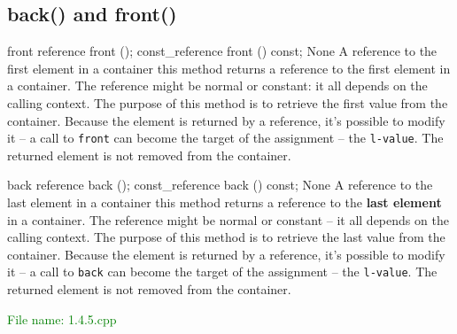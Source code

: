 
\subsection{back() and front()} %
\begin{methodinfo}
  {front}
  {reference front (); 
  const_reference front () const;}
  {None}
  {A reference to the first element in a container}
  {this method returns a reference to the first element in a container. The reference might be normal or 
  constant: it all depends on the calling context.
  The purpose of this method is to retrieve the first value from the container. Because the element is 
  returned by a reference, it’s possible to modify it – a call to \texttt{front} can become the target of the 
  assignment – the \texttt{l-value}. The returned element is not removed from the container.}
\end{methodinfo}

\begin{methodinfo}
  {back}
  {reference back ();
  const_reference back () const;}
  {None}
  {A reference to the last element in a container}
  {this method returns a reference to the \textbf{last element} in a container. The reference might be normal or 
  constant – it all depends on the calling context.
  The purpose of this method is to retrieve the last value from the container. Because the element is 
  returned by a reference, it’s possible to modify it – a call to \texttt{back} can become the target of the 
  assignment – the \texttt{l-value}. The returned element is not removed from the container.}
\end{methodinfo}

\textcolor{green}{File name: 1.4.5.cpp}

